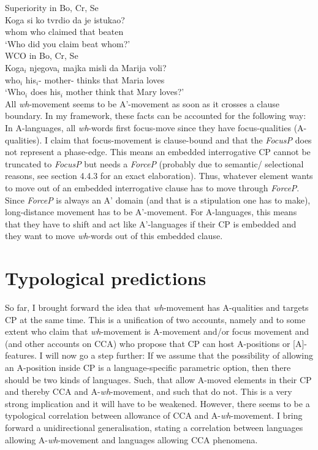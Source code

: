 \documentclass[output=paper,colorlinks,citecolor=brown]{langscibook}
\begin{document}
\ea 
  \ea\label{lohningerbcslong}
  {Superiority} in {Bo, Cr, Se} \citep[51]{richards1997}\\
    \gll * Koga si ko tvrdio da je istukao?\\
    {} whom  who claimed that  beaten\\
    \glt \hphantom{*} `Who did you claim beat whom?'\\
  \ex\label{lohningerbcslongwco}
  {WCO} in {Bo, Cr, Se} \citep[33]{richards1997}\\
    \gll * Koga$_{i}$ njegova$_{i}$ majka misli da Marija voli?\\
    {} who$_{i}$ his$_{i}$- mother- thinks that Maria loves\\
    \glt \hphantom{*} `Who$_{i}$ does his$_{i}$ mother think that Mary loves?'\\ 
  \z
\z 
All \textit{wh}-movement seems to be A'-movement as soon as it crosses a clause boundary. In my framework, these facts can be accounted for the following way: In A-languages, all \textit{wh}-words first focus-move since they have focus-qualities (A-qualities). I claim that focus-movement is clause-bound and that the \emph{FocusP} does not represent a phase-edge. This means an embedded interrogative CP cannot be truncated to \emph{FocusP} but needs a \emph{ForceP} (probably due to semantic/ selectional reasons, see section 4.4.3 for an exact elaboration). Thus, whatever element wants to move out of an embedded interrogative clause has to move through \emph{ForceP}. Since \emph{ForceP} is always an A' domain (and that is a stipulation one has to make), long-distance movement has to be A'-movement. For A-languages, this means that they have to shift and act like A'-languages if their CP is embedded and they want to move \textit{wh}-words out of this embedded clause. 

\section{Typological predictions}
So far, I brought forward the idea that \textit{wh}-movement has A-qualities and targets CP at the same time. This is a unification of two accounts, namely \citet{richards1997} and to some extent \citet{bovskovic2002multiple} who claim that \textit{wh}-movement is A-movement and/or focus movement and \citet{wurmbrand2018cross} (and other accounts on CCA) who propose that CP can host A-positions or [A]-features. I will now go a step further: If we assume that the possibility of allowing an A-position inside CP is a language-specific parametric option, then there should be two kinds of languages. Such, that allow A-moved elements in their CP and thereby CCA and A-\textit{wh}-movement, and such that do not. This is a very strong implication and it will have to be weakened. However, there seems to be a typological correlation between allowance of CCA and A-\textit{wh}-movement. I bring forward a unidirectional generalisation, stating a correlation between languages allowing A-\textit{wh}-movement and languages allowing CCA phenomena.
\end{document}
